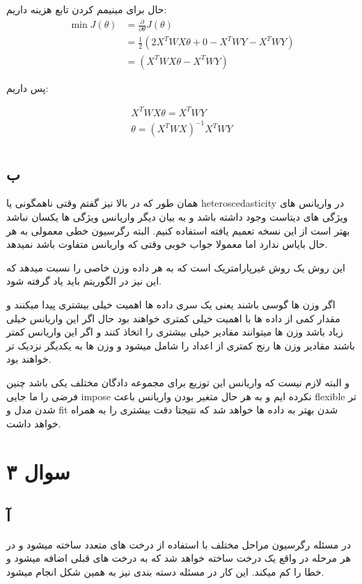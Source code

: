 \documentclass{article}[12pt]
\begin{document}
حال برای مینیمم کردن تابع هزینه داریم:
\begin{equation*}
\begin{split}
\min J(\theta) &= \frac{\partial}{\partial \theta}
J(\theta) \\&=
\frac{1}{2} (
2 X^T W X \theta + 0 - X^T W Y  
 - X^T W Y )
 \\&= (X^T W  X \theta - X^T W Y)
\end{split}
\end{equation*}

پس داریم:

\begin{gather*}
X^T W X \theta = X^T W Y  \\
\theta = (X^T W X)^{-1}  X^T W Y \\
\end{gather*}
\clearpage
\subsection{ب}
همان طور که در بالا نیز گفتم وقتی ناهمگونی یا heteroscedasticity
در واریانس های ویژگی های دیتاست وجود داشته باشد و به بیان دیگر واریانس ویژگی ها یکسان نباشد بهتر است از این نسخه تعمیم یافته 
استفاده کنیم. 
البته رگرسیون خطی معمولی به هر حال بایاس ندارد اما معمولا جواب خوبی وقتی که واریانس متفاوت باشد نمیدهد. 

این روش یک روش غیرپارامتریک است که به هر داده وزن خاصی را نسبت میدهد که این نیز در الگوریتم باید یاد گرفته شود. 

اگر وزن ها گوسی باشند یعنی یک سری داده ها اهمیت خیلی بیشتری پیدا میکنند و مقدار کمی از داده ها با اهمیت خیلی کمتری خواهند بود حال اگر این واریانس خیلی زیاد باشد وزن ها میتوانند مقادیر خیلی بیشتری را اتخاذ کنند و اگر این واریانس کمتر باشند مقادیر وزن ها رنج کمتری از اعداد را شامل میشود و وزن ها به یکدیگر نزدیک تر خواهند بود. 

و البته لازم نیست که واریانس این توزیع برای مجموعه دادگان مختلف یکی باشد چنین فرضی را ما جایی impose نکرده ایم و به هر حال متغیر بودن واریانس باعث flexible تر شدن مدل و fit شدن بهتر به داده ها خواهد شد که نتیجتا دقت بیشتری را به همراه خواهد داشت. 

\clearpage
\section{سوال ۳}
\subsection{آ}
در مسئله رگرسیون مراحل مختلف با استفاده از درخت های متعدد ساخته میشود و در هر مرحله در واقع یک درخت ساخته خواهد شد که به درخت های قبلی اضافه میشود و خطا را کم میکند. این کار در مسئله دسته بندی نیز به همین شکل انجام میشود. 
\end{document}
